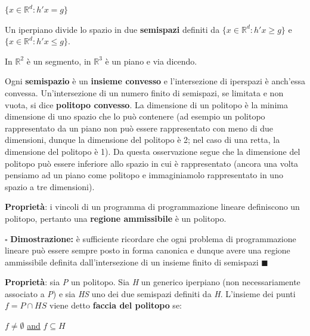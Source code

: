 \documentclass[11pt]{book}
\begin{document}
\begin{center}
$\{x \in \mathbb{R}^d : h'x = g\}$
\end{center}

Un iperpiano divide lo spazio in due {\bf semispazi} definiti da $\{x
\in \mathbb{R}^d : h'x \geq g\}$ e $\{x \in \mathbb{R}^d : h'x \leq
g\}$.


In $\mathbb{R}^2$ \`e un segmento, in $\mathbb{R}^3$ \`e un
piano e via dicendo. 

Ogni {\bf semispazio} \`e un {\bf insieme convesso} e l'intersezione
di iperspazi \`e anch'essa convessa. Un'intersezione di un numero
finito di semispazi, se limitata e non vuota, si dice {\bf politopo
  convesso}. La dimensione di un politopo \`e la minima dimensione di
uno spazio che lo pu\`o contenere (ad esempio un politopo
rappresentato da un piano non pu\`o essere rappresentato con meno di
due dimensioni, dunque la dimensione del politopo \`e 2; nel caso di
una retta, la dimensione del politopo \`e 1). Da questa osservazione
segue che la dimensione del politopo pu\`o essere inferiore allo
spazio in cui \`e rappresentato (ancora una volta pensiamo ad un piano
come politopo e immaginiamolo rappresentato in uno spazio a tre
dimensioni).
\newline\vspace{11pt}

{\bf Propriet\`a}: i vincoli di un programma di programmazione lineare definiscono un
politopo, pertanto una {\bf regione ammissibile} \`e un politopo. 
\newline\vspace{11pt}

$\square$ {\bf Dimostrazione:} \`e sufficiente ricordare che ogni
problema di programmazione lineare pu\`o essere sempre posto in forma
canonica e dunque avere una regione ammissibile definita
dall'intersezione di un insieme finito di semispazi
$\blacksquare$
\newline\vspace{11pt}


{\bf Propriet\`a}: sia {\em P} un politopo. Sia {\em H} un generico
iperpiano (non ne\-ces\-sa\-ria\-men\-te associato a {\em P}) e sia
{\em HS} uno dei due semispazi definiti da {\em H}. L'insieme dei
punti $f = P \cap HS$ viene detto {\bf faccia del politopo} se:

\begin{center}
$f \not = \emptyset$ \underline{and} $f \subseteq H$
\end{center}
\vspace{11pt}
\end{document}

